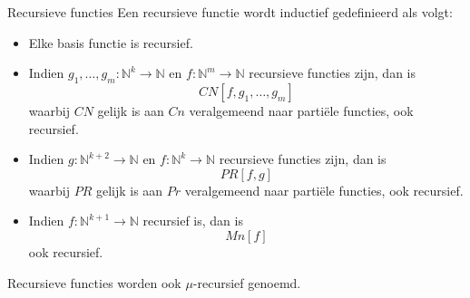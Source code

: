 \begin{theo}{Recursieve functies}
    Een recursieve functie wordt inductief gedefinieerd als volgt:
    \begin{itemize}
        \item 
            Elke basis functie is recursief.
        \item
            Indien $g_1, \ldots, g_m: \mathbb{N}^k \to \mathbb{N}$ en $f: \mathbb{N}^m \to \mathbb{N}$ recursieve functies zijn, dan is 
            \begin{equation*}
                CN[f, g_1, \ldots, g_m]
            \end{equation*} 
            waarbij $CN$ gelijk is aan $Cn$ veralgemeend naar partiële functies, ook recursief.
        \item 
            Indien $g: \mathbb{N}^{k+2} \to \mathbb{N}$ en $f: \mathbb{N}^{k} \to \mathbb{N}$ recursieve functies zijn, dan is 
            \begin{equation*}
                PR[f,g]
            \end{equation*}
            waarbij $PR$ gelijk is aan $Pr$ veralgemeend naar partiële functies, ook recursief.  
        \item  
            Indien $f: \mathbb{N}^{k+1} \to \mathbb{N}$ recursief is, dan is 
            \begin{equation*}
                Mn[f]
            \end{equation*}
            ook recursief. 
    \end{itemize}
    Recursieve functies worden ook $\mu$-recursief genoemd.
\end{theo}